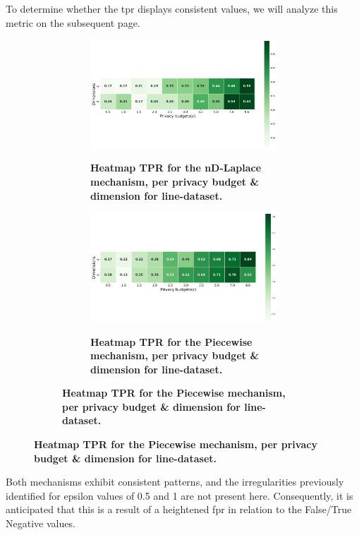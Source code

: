 To determine whether the \gls{tpr} displays consistent values, we will analyze this metric on the subsequent page.
\newpage
\begin{figure}[H]
  \centering
  \begin{subfigure}[b]{0.9\textwidth}
    \begin{subfigure}[c]{1\textwidth}
      \caption{\textbf{Heatmap TPR for the nD-Laplace mechanism, per privacy budget \& dimension for line-dataset.}}
      \includegraphics[width=1\textwidth]{Results/nd-laplace/nd-Laplace/line-dataset/tpr.png}
      \label{fig:privacy_tpr_line-dataset_adversial_advantage_kd-laplace}
    \end{subfigure}
    \vfill %

    \begin{subfigure}[c]{1\textwidth}
      \caption{\textbf{Heatmap TPR for the Piecewise mechanism, per privacy budget \& dimension for line-dataset.}}
      \includegraphics[width=1\textwidth]{Results/nd-laplace/piecewise/line-dataset/tpr.png}
      \label{fig:privacy_tpr_line-dataset_adversial_advantage_piecewise}
    \end{subfigure}
  \end{subfigure}
\end{figure}
Both mechanisms exhibit consistent patterns, and the irregularities previously identified for epsilon values of 0.5 and 1 are not present here. Consequently, it is anticipated that this is a result of a heightened \gls{fpr} in relation to the False/True Negative values.

